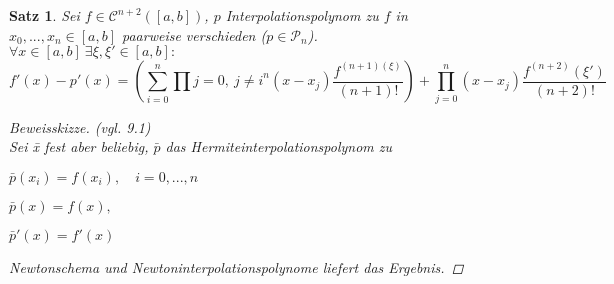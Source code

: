 \documentclass[12pt]{article}
\theoremstyle{break}
\newtheorem{theorem}{Satz}[subsection]
\begin{document}
\begin{theorem}
Sei $f \in \mathcal{C}^{n+2}([a,b])$, $p$ Interpolationspolynom zu $f$ in $x_0,..., x_n \in [a,b]$ paarweise verschieden ($p\in \mathcal{P}_n$). \\
$\forall x \in [a,b] \medspace \exists \xi, \xi' \in [a,b]:$ 
$$f'(x) - p'(x) = \left( \sum_{i=0}^n \prod{j=0, \medspace j \neq i}^n (x-x_j) \frac{f^{(n+1)(\xi)}}{(n+1)!}\right) + \prod_{j=0}^n (x-x_j) \frac{f^{(n+2)}(\xi')}{(n+2)!}$$
\begin{proof}[Beweisskizze] (vgl. 9.1) \\
Sei \={x} fest aber beliebig, $\bar{p}$ das Hermiteinterpolationspolynom zu 
\begin{description}
  \item $\bar{p}(x_i) = f(x_i), \quad i=0,...,n$
  \item $\bar{p}(x) = f(x),$
  \item $\bar{p}'(x) = f'(x)$
\end{description}
Newtonschema und Newtoninterpolationspolynome liefert das Ergebnis.
\end{proof}
\end{theorem}
\end{document}
